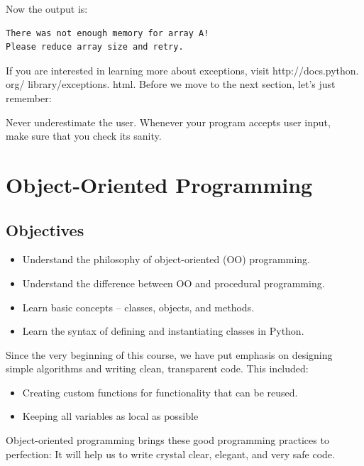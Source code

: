 \documentclass[article,A4,12pt]{llncs}
\begin{document}
\noindent
Now the output is:\\

\begin{ybox}
\begin{verbatim}
There was not enough memory for array A!
Please reduce array size and retry.
\end{verbatim}
\end{ybox}
\vspace{6mm}

\noindent
If you are interested in 
learning more about exceptions, visit http://docs.python. org/ library/exceptions. html.
Before we move to the next section, let's just remember:\\

\begin{gbox}
\begin{center}
Never underestimate the user. Whenever your program accepts user 
input,\\ make sure that you check its sanity. 
\end{center}
\end{gbox}
\vspace{6mm}

\noindent


\section{Object-Oriented Programming}

\subsection{Objectives}

\begin{itemize}
\item Understand the philosophy of object-oriented (OO) programming.
\item Understand the difference between OO and procedural programming.
\item Learn basic concepts -- classes, objects, and methods.
\item Learn the syntax of defining and instantiating classes in Python.
\end{itemize}
Since the very beginning of this course, 
we have put emphasis on designing simple algorithms
and writing clean, transparent code. This included:
\begin{itemize}
\item Creating custom functions for functionality that can be reused.
\item Keeping all variables as local as possible
\end{itemize}
Object-oriented programming brings these good programming practices to
perfection: It will help us to write crystal clear, elegant, and very safe code.
\end{document}
